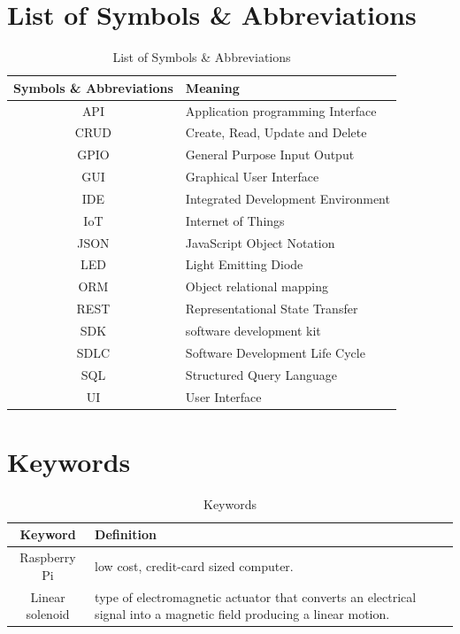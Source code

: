 \documentclass[12pt, oneside, a4paper]{book}
\newcommand\boldcolor[1]{\textcolor{bold}{\textbf{#1}}}
\begin{document}
	\listoffigures
	\newpage
	
	\chapter*{List of Symbols \& Abbreviations}
	\label{sec:sym}
	\def\arraystretch{1.5}
	\begin{table}[H]
		\begin{center}
			\begin{tabularx}{\linewidth}{|c|X|}\hline
				
				\boldcolor{Symbols \& Abbreviations} & \boldcolor{Meaning} \\\hline
				API & Application programming Interface\\\hline
				CRUD & Create, Read, Update and Delete\\\hline
				GPIO & General Purpose Input Output\\\hline
				GUI & Graphical User Interface\\\hline
				IDE & Integrated Development Environment \\\hline
				IoT & Internet of Things \\\hline
				JSON & JavaScript Object Notation\\\hline
				LED & Light Emitting Diode\\\hline
				ORM & Object relational mapping\\\hline
				REST & Representational State Transfer\\\hline
				SDK & software development kit \\\hline
				SDLC & Software Development Life Cycle\\\hline
				SQL & Structured Query Language\\\hline
				UI & User Interface\\\hline
			\end{tabularx}
		\end{center}
		\caption{List of Symbols \& Abbreviations}
	\end{table}
	\newpage
	\chapter*{Keywords}
	\label{sec:kw}
	\def\arraystretch{1.5}
	\begin{table}[H]
		\begin{center}
			\begin{tabularx}{\linewidth}{|c|X|}\hline		
				\boldcolor{Keyword} & \boldcolor{Definition} \\\hline
				Raspberry Pi & low cost, credit-card sized computer\cite{raspberry}. \\\hline
				Linear solenoid &  type of electromagnetic actuator that converts an electrical signal into a magnetic field producing a linear motion\cite{linear}.\\\hline				
			\end{tabularx}
		\end{center}
		\caption{Keywords}
	\end{table}
	\newpage
\end{document}

